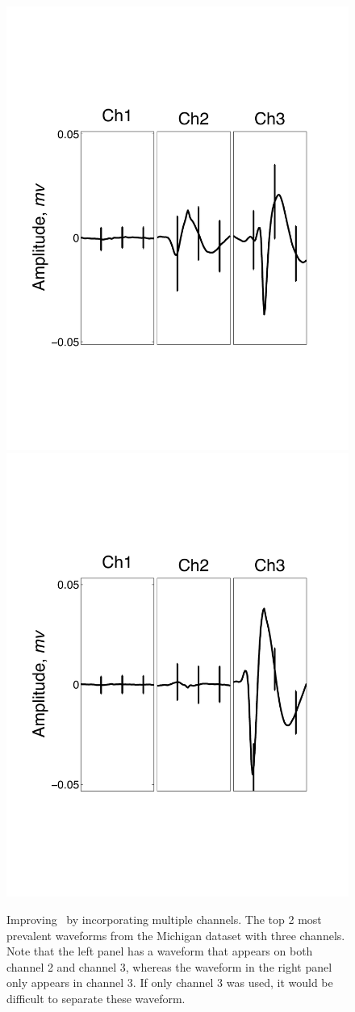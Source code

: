 \begin{center}
\begin{figure}
	\includegraphics[width=.3\textwidth]{../figs/3devim/clus1}
	\includegraphics[width=.3\textwidth]{../figs/3devim/clus2}
\caption{
Improving \smug\ by incorporating {multiple} channels.
The top 2 most prevalent waveforms from the Michigan dataset with three channels.  Note that the left panel has a waveform that appears on both channel 2 and channel 3, whereas the waveform in the right panel  only appears in channel 3.  If only channel 3 was used, it would be difficult to separate these waveform. %
}
\end{figure}
\end{center}














